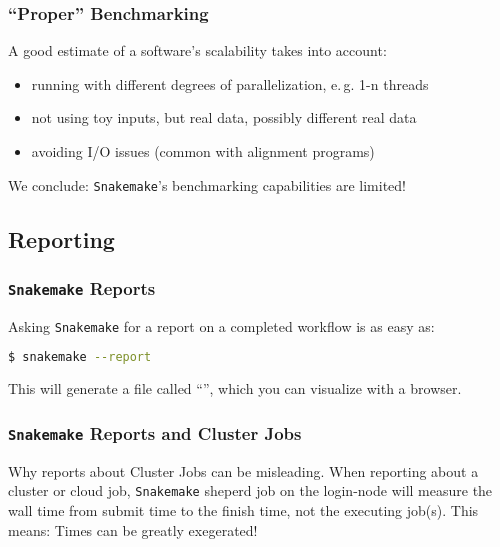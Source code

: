\begin{frame}
  \frametitle{``Proper'' Benchmarking}
  A good estimate of a software's scalability takes into account:
  \begin{itemize}[<+->]
   \item running with different degrees of parallelization, e.\,g. 1-n threads
   \item not using toy inputs, but real data, possibly different real data
   \item avoiding I/O issues (common with alignment programs)
  \end{itemize}
  \pause
  \begin{warning}
  	We conclude: \texttt{Snakemake}'s benchmarking capabilities are limited!
  \end{warning}
\end{frame}

\subsection{Reporting}

\begin{frame}[fragile]
  \frametitle{\texttt{Snakemake} Reports}
  Asking \texttt{Snakemake} for a report on a completed workflow is as easy as:
  \begin{lstlisting}[language=Bash, style=Shell]
$ snakemake --report
  \end{lstlisting}
  This will generate a file called ``'', which you can visualize with a browser.
\end{frame} 

\begin{frame}
  \frametitle{\texttt{Snakemake} Reports and Cluster Jobs}
  \begin{alertblock}{Why reports about Cluster Jobs can be misleading.}
    When reporting about a cluster or cloud job, \texttt{Snakemake} sheperd job on the login-node will measure the wall time from submit time to the finish time, not the executing job(s).\newline
    This means: Times can be greatly exegerated!
  \end{alertblock}
\end{frame} 

